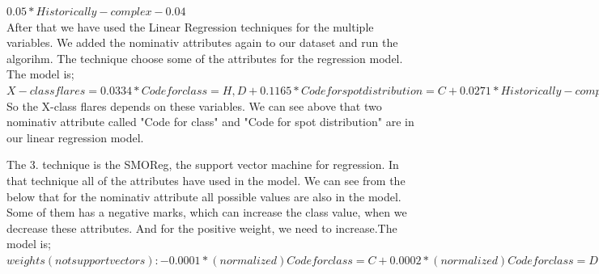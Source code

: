 \documentclass[a4paper]{article}
\begin{document}
$0.05 * Historically-complex - 0.04$\\

After that we have used the Linear Regression techniques for the multiple variables. We added the nominativ attributes again to our dataset and run the algorihm. The technique choose some of the attributes for the regression model. The model is;\\

$   X-class flares =   0.0334 * Code for class=H,D +
      0.1165 * Code for spot distribution=C +
      0.0271 * Historically-complex +
     -0.038 $\\

So the X-class flares depends on these variables. We can see above that two nominativ attribute called "Code for class" and "Code for spot distribution" are in our linear regression model.

The 3. technique is the SMOReg, the support vector machine for regression. In that technique all of the attributes have used in the model. We can see from the below that for the nominativ attribute all possible values are also in the model. Some of them has a negative marks, which can increase the class value, when we decrease these attributes. And for the positive weight, we need to increase.The model is;\\
$weights (not support vectors):
 -       0.0001 * (normalized) Code for class=C
 +       0.0002 * (normalized) Code for class=D
 +       0.0002 * (normalized) Code for class=B
 +       0      * (normalized) Code for class=F
 +       0.0002 * (normalized) Code for class=H
 -       0.0006 * (normalized) Code for class=E
 -       0.0002 * (normalized) Code for largest spot size=S
 +       0.0004 * (normalized) Code for largest spot size=A
 -       0.0001 * (normalized) Code for largest spot size=K
 +       0.0002 * (normalized) Code for largest spot size=R
 +       0.0002 * (normalized) Code for largest spot size=X
 -       0.0005 * (normalized) Code for largest spot size=H
 +       0.0002 * (normalized) Code for spot distribution=O
 -       0.0007 * (normalized) Code for spot distribution=I
 +       0.0002 * (normalized) Code for spot distribution=X
 +       0.0002 * (normalized) Code for spot distribution=C
 -       0.0006 * (normalized) Activity
 +       0.0003 * (normalized) Evolution
 +       0.0003 * (normalized) Previous 24 hour flare activity code
 +       0.001  * (normalized) Historically-complex
 +       0      * (normalized) Did region become historically complex on this pass across the sun's disk
 +       0.0002 * (normalized) Area
 +       0.0004 * (normalized) Area of the largest spot
 -       0.0007$\\
\end{document}
